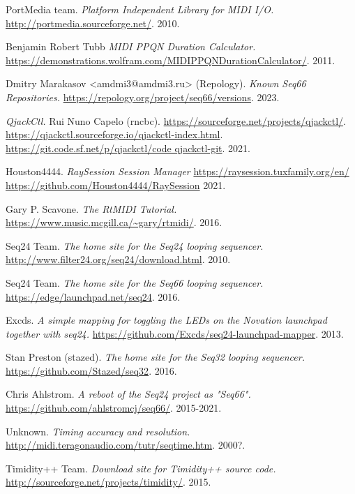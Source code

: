 {\begin{thebibliography}{99}
   PortMedia team.
   \emph{Platform Independent Library for MIDI I/O.}
   \url{http://portmedia.sourceforge.net/}.
   2010.

   Benjamin Robert Tubb
   \emph{MIDI PPQN Duration Calculator.}
   \url{https://demonstrations.wolfram.com/MIDIPPQNDurationCalculator/}.
   2011.

   Dmitry Marakasov <amdmi3@amdmi3.ru> (Repology).
   \emph{Known Seq66 Repositories.}
   \url{https://repology.org/project/seq66/versions}.
   2023.

   \emph{QjackCtl.}
   Rui Nuno Capelo (rncbc).
   \url{https://sourceforge.net/projects/qjackctl/}.
   \url{https://qjackctl.sourceforge.io/qjackctl-index.html}.
   \url{https://git.code.sf.net/p/qjackctl/code qjackctl-git}.
   2021.

   Houston4444.
   \emph{RaySession Session Manager}
   \url{https://raysession.tuxfamily.org/en/}
   \url{https://github.com/Houston4444/RaySession}
   2021.

   Gary P. Scavone.
   \emph{The RtMIDI Tutorial.}
   \url{https://www.music.mcgill.ca/~gary/rtmidi/}.
   2016.

   Seq24 Team.
   \emph{The home site for the Seq24 looping sequencer.}
   \url{http://www.filter24.org/seq24/download.html}.
   2010.

   Seq24 Team.
   \emph{The home site for the Seq66 looping sequencer.}
   \url{https://edge/launchpad.net/seq24}.
   2016.

   Excds.
   \emph{A simple mapping for toggling the LEDs on the Novation launchpad
   together with seq24.}
   \url{https://github.com/Excds/seq24-launchpad-mapper}.
   2013.

   Stan Preston (stazed).
   \emph{The home site for the Seq32 looping sequencer.}
   \url{https://github.com/Stazed/seq32}.
   2016.

   Chris Ahlstrom.
   \emph{A reboot of the Seq24 project as "Seq66".}
   \url{https://github.com/ahlstromcj/seq66/}.
   2015-2021.

   Unknown.
   \emph{Timing accuracy and resolution.}
   \url{http://midi.teragonaudio.com/tutr/seqtime.htm}.
   2000?.

   Timidity++ Team.
   \emph{Download site for Timidity++ source code.}
   \url{http://sourceforge.net/projects/timidity/}.
   2015.


\end{thebibliography}}
